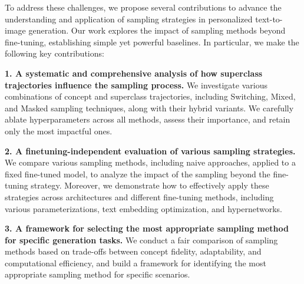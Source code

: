 To address these challenges, we propose several contributions to advance the understanding and application of sampling strategies in personalized text-to-image generation. Our work explores the impact of sampling methods beyond fine-tuning, establishing simple yet powerful baselines. In particular, we make the following key contributions:

\textbf{1. A systematic and comprehensive analysis of how superclass trajectories influence the sampling process.} We investigate various combinations of concept and superclass trajectories, including Switching, Mixed, and Masked sampling techniques, along with their hybrid variants. We carefully ablate hyperparameters across all methods, assess their importance, and retain only the most impactful ones.


\textbf{2. A finetuning-independent evaluation of various sampling strategies.} We compare various sampling methods, including naive approaches, applied to a fixed fine-tuned model, to analyze the impact of the sampling beyond the fine-tuning strategy. Moreover, we demonstrate how to effectively apply these strategies across architectures and different fine-tuning methods, including various parameterizations, text embedding optimization, and hypernetworks.


\textbf{3. A framework for selecting the most appropriate sampling method for specific generation tasks.} We conduct a fair comparison of sampling methods based on trade-offs between concept fidelity, adaptability, and computational efficiency, and build a framework for identifying the most appropriate sampling method for specific scenarios.
